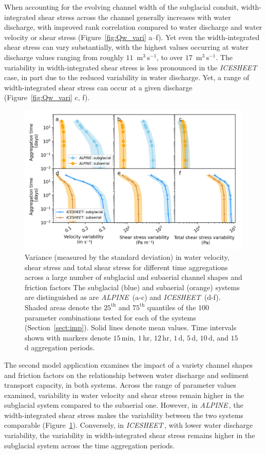 \documentclass[11pt]{article}
\newcommand{\alpine}{\textit{ALPINE}\,}
\newcommand{\icesheet}{\textit{ICESHEET}\,}
\newcommand{\unit}[1]{$\mathrm{#1}$}
\begin{document}
When accounting for the evolving channel width of the subglacial conduit, width-integrated shear stress  across the channel generally increases with water discharge, with improved rank correlation compared to water discharge and water velocity or shear stress (Figure~\ref{fig:Qw_vari} a--f).
Yet even the width-integrated shear stress  can vary substantially, with the highest values occurring at water discharge values ranging from roughly $11$ \,\unit{m}$^3$\,\unit{s}$^{-1}$, to over $17$ \,\unit{m}$^3$\,\unit{s}$^{-1}$.
The variability in width-integrated shear stress is less pronounced in the \icesheet case, in part due to the reduced variability in water discharge.
Yet, a range of width-integrated shear stress can occur at a given discharge (Figure~\ref{fig:Qw_vari} c, f).


\begin{figure}[h]
  \centering
    \includegraphics[width=0.8\linewidth]{Fig4.png}
    \caption{Variance (measured by the standard deviation) in water velocity, shear stress and total shear stress for different time aggregations across a large number of subglacial and subaerial channel shapes and friction factors The subglacial (blue) and subaerial (orange) systems are distinguished as are \alpine{} (a-c) and \icesheet{} (d-f).
      Shaded areas denote the $25^{\mathrm{th}}$ and $75^{\mathrm{th}}$ quantiles of the $100$ parameter combinations tested for each of the systems (Section~\ref{sect:imp}).
      Solid lines denote  mean values.
      Time intervals shown with markers denote $15$\,\unit{min}, $1$\,\unit{hr}, $12$\,\unit{hr}, $1$\,\unit{d}, $5$\,\unit{d}, $10$\,\unit{d}, and $15$\,\unit{d} aggregation periods.
    } 
    \label{fig:multi_run}
  \end{figure}

The second model application examines the impact of a variety channel shapes and friction factors on the relationship between water discharge and sediment transport capacity, in both systems.
Across the range of parameter values examined, variability in water velocity and shear stress remain higher in the subglacial system compared to the subaerial one.
However, in \alpine{}, the width-integrated shear stress makes the variability between the two systems comparable (Figure~\ref{fig:multi_run}).
Conversely, in \icesheet{}, with lower water discharge variability, the variability in width-integrated shear stress remains higher in the subglacial system across the time aggregation periods.
\end{document}
